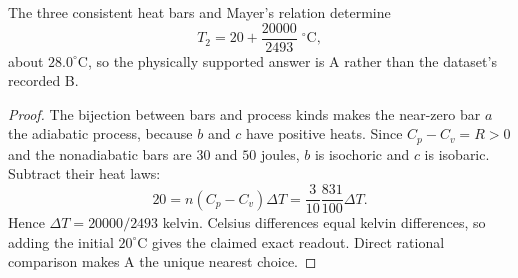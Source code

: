 \begin{theorem}
\label{thm:physics:phyx_mini_0346:target}
The three consistent heat bars and Mayer's relation determine
\[
 T_2=20+\frac{20000}{2493}\;^\circ\mathrm C,
\]
about \(28.0^\circ\mathrm C\), so the physically supported answer is A rather
than the dataset's recorded B.
\end{theorem}
\begin{proof}
The bijection between bars and process kinds makes the near-zero bar \(a\)
the adiabatic process, because \(b\) and \(c\) have positive heats.  Since
\(C_p-C_v=R>0\) and the nonadiabatic bars are \(30\) and \(50\) joules, \(b\)
is isochoric and \(c\) is isobaric.  Subtract their heat laws:
\[
 20=n(C_p-C_v)\Delta T
   =\frac3{10}\frac{831}{100}\Delta T.
\]
Hence \(\Delta T=20000/2493\) kelvin.  Celsius differences equal kelvin
differences, so adding the initial \(20^\circ\mathrm C\) gives the claimed
exact readout.  Direct rational comparison makes A the unique nearest choice.
\end{proof}

